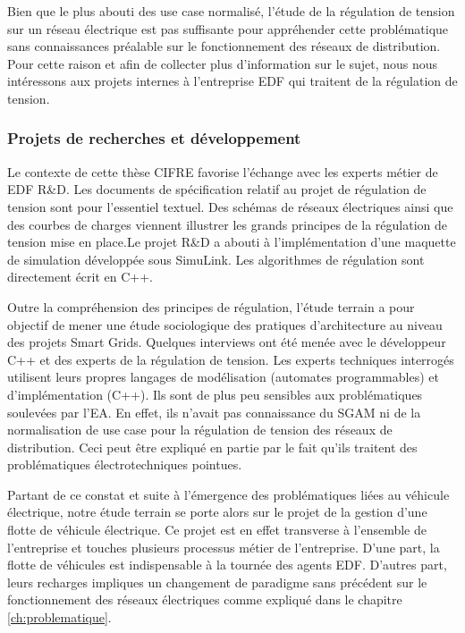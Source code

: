 Bien que le plus abouti des use case normalisé, l'étude de la régulation de 
tension sur un  réseau électrique est pas suffisante pour appréhender cette 
problématique sans connaissances préalable sur le fonctionnement des réseaux de 
distribution. Pour cette raison et afin de collecter plus d'information sur le 
sujet, nous nous intéressons aux projets internes à l'entreprise EDF qui 
traitent de la régulation de tension.
 

\subsubsection{Projets de recherches et développement}

Le contexte de cette thèse CIFRE favorise l'échange avec les experts métier de 
EDF R\&D. Les documents de spécification relatif au projet de régulation de 
tension sont pour l'essentiel textuel. Des schémas de réseaux électriques ainsi 
que des courbes de charges viennent illustrer les grands principes de la 
régulation de tension mise en place.Le projet R\&D a abouti à l'implémentation 
d'une maquette de simulation 
développée sous SimuLink. Les algorithmes de régulation sont directement écrit 
en C++. 

Outre la compréhension des principes de régulation, l'étude terrain a pour 
objectif de mener une étude sociologique des pratiques d'architecture au niveau 
des projets Smart Grids. Quelques interviews ont été menée avec le développeur 
C++  et des experts de la régulation de tension. Les experts techniques 
interrogés utilisent leurs propres langages de modélisation (automates 
programmables) et d'implémentation (C++). Ils sont de plus peu sensibles aux 
problématiques soulevées par l'EA. En effet, ils n'avait pas connaissance du 
SGAM ni de la normalisation de use case pour la régulation de tension des 
réseaux de distribution. Ceci peut être expliqué en partie par le fait qu'ils 
traitent des problématiques électrotechniques pointues. 

Partant de ce constat et suite à l'émergence des problématiques liées au 
véhicule électrique, notre étude terrain se porte alors sur le projet de la 
gestion d'une flotte de véhicule électrique. Ce projet est en effet transverse à 
l'ensemble de l'entreprise et touches plusieurs processus métier de 
l'entreprise. D'une part, la flotte de véhicules est indispensable à la tournée 
des agents EDF. D'autres part, leurs recharges impliques un changement de 
paradigme sans précédent sur le fonctionnement des réseaux électriques comme 
expliqué dans le chapitre \ref{ch:problematique}.

